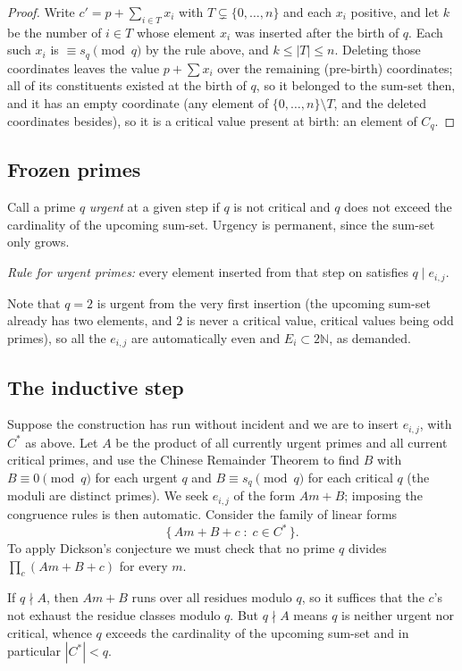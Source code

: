 \documentclass[11pt]{amsart}
\theoremstyle{remark}
\newcommand{\NN}{\mathbb{N}}
\begin{document}
\begin{proof}
Write $c'=p+\sum_{i\in T}x_i$ with $T\subsetneq\{0,\dots,n\}$ and each
$x_i$ positive, and let $k$ be the number of $i\in T$ whose element
$x_i$ was inserted after the birth of $q$.  Each such $x_i$ is
$\equiv s_q\pmod q$ by the rule above, and $k\le|T|\le n$.  Deleting
those coordinates leaves the value $p+\sum x_i$ over the remaining
(pre-birth) coordinates; all of its constituents existed at the birth
of $q$, so it belonged to the sum-set then, and it has an empty
coordinate (any element of $\{0,\dots,n\}\setminus T$, and the deleted
coordinates besides), so it is a critical value present at birth:
an element of $C_q$.
\end{proof}

\subsection*{Frozen primes}

Call a prime $q$ \emph{urgent} at a given step if $q$ is not critical
and $q$ does not exceed the cardinality of the upcoming sum-set.
Urgency is permanent, since the sum-set only grows.

\emph{Rule for urgent primes:} every element inserted from that step
on satisfies $q \mid e_{i,j}$.

Note that $q=2$ is urgent from the very first insertion (the upcoming
sum-set already has two elements, and $2$ is never a critical value,
critical values being odd primes), so all the $e_{i,j}$ are
automatically even and $E_i\subset 2\NN$, as demanded.

\subsection*{The inductive step}

Suppose the construction has run without incident and we are to insert
$e_{i,j}$, with $C^\ast$ as above.  Let $A$ be the product of all
currently urgent primes and all current critical primes, and use the
Chinese Remainder Theorem to find $B$ with $B\equiv 0 \pmod q$ for
each urgent $q$ and $B\equiv s_q\pmod q$ for each critical $q$ (the
moduli are distinct primes).  We seek $e_{i,j}$ of the form $Am+B$;
imposing the congruence rules is then automatic.  Consider the family
of linear forms
\[
\{\,Am+B+c \;:\; c\in C^\ast\,\}.
\]
To apply Dickson's conjecture we must check that no prime $q$ divides
$\prod_{c}(Am+B+c)$ for every $m$.

If $q\nmid A$, then $Am+B$ runs over all residues modulo $q$, so it
suffices that the $c$'s not exhaust the residue classes modulo $q$.
But $q\nmid A$ means $q$ is neither urgent nor critical, whence $q$
exceeds the cardinality of the upcoming sum-set and in particular
$|C^\ast|<q$.
\end{document}

